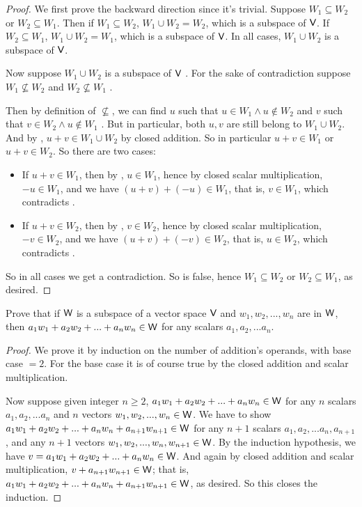 \begin{proof}
We first prove the backward direction since it's trivial.
Suppose \(W_1 \subseteq W_2\) or \(W_2 \subseteq W_1\).
Then if \(W_1 \subseteq W_2\), \(W_1 \cup W_2 = W_2\), which is a subspace of \(\textsf{V}\).
If \(W_2 \subseteq W_1\), \(W_1 \cup W_2 = W_1\), which is a subspace of \(\textsf{V}\).
In all cases, \(W_1 \cup W_2\) is a subspace of \(\textsf{V}\).

Now suppose \(W_1 \cup W_2\) is a subspace of \(\textsf{V}\) .
For the sake of contradiction suppose \(W_1 \not \subseteq W_2\) and \(W_2 \not \subseteq W_1\) .

Then by definition of \(\not \subseteq\), we can find \(u\) such that \(u \in W_1 \land u \not \in W_2\)  and \(v\) such that \(v \in W_2 \land u \not \in W_1\) .
But in particular, both \(u, v\) are still belong to \(W_1 \cup W_2\).
And by , \(u + v \in W_1 \cup W_2\) by closed addition.
So in particular \(u + v \in W_1\) or \(u + v \in W_2\).
So there are two cases:
\begin{itemize}
    \item If \(u + v \in W_1\), then by , \(u \in W_1\), hence by closed scalar multiplication, \(-u \in W_1\), and we have \((u + v) + (-u) \in W_1\), that is, \(v \in W_1\), which contradicts .
    \item If \(u + v \in W_2\), then by , \(v \in W_2\), hence by closed scalar multiplication, \(-v \in W_2\), and we have \((u + v) + (-v) \in W_2\), that is, \(u \in W_2\), which contradicts .
\end{itemize}
So in all cases we get a contradiction.
So  is false, hence \(W_1 \subseteq W_2\) or \(W_2 \subseteq W_1\), as desired.
\end{proof}

\begin{exercise} \label{exercise 1.3.20}
Prove that if \(\textsf{W}\) is a subspace of a vector space \(\textsf{V}\) and \(w_1, w_2, ..., w_n\) are in \(\textsf{W}\), then \(a_1 w_1 + a_2 w_2 + ... + a_n w_n \in \textsf{W}\) for any scalars \(a_1, a_2, ... a_n\).
\end{exercise}

\begin{proof}
We prove it by induction on the number of addition's operands, with base case \(= 2\).
For the base case it is of course true by the closed addition and scalar multiplication.

Now suppose given integer \(n \ge 2\), \(a_1 w_1 + a_2 w_2 + ... + a_n w_n \in \textsf{W}\) for any \(n\) scalars \(a_1, a_2, ... a_n\) and \(n\) vectors \(w_1, w_2, ..., w_n \in \textsf{W}\).
We have to show \(a_1 w_1 + a_2 w_2 + ... + a_n w_n + a_{n + 1} w_{n + 1} \in \textsf{W}\) for any \(n + 1\) scalars \(a_1, a_2, ... a_n, a_{n + 1}\),
and any \(n + 1\) vectors \(w_1, w_2, ..., w_n, w_{n + 1} \in \textsf{W}\).
By the induction hypothesis, we have \(v = a_1 w_1 + a_2 w_2 + ... + a_n w_n \in \textsf{W}\).
And again by closed addition and scalar multiplication, \(v + a_{n + 1} w_{n + 1} \in \textsf{W}\);
that is, \(a_1 w_1 + a_2 w_2 + ... + a_n w_n + a_{n + 1} w_{n + 1} \in \textsf{W}\), as desired.
So this closes the induction.
\end{proof}

